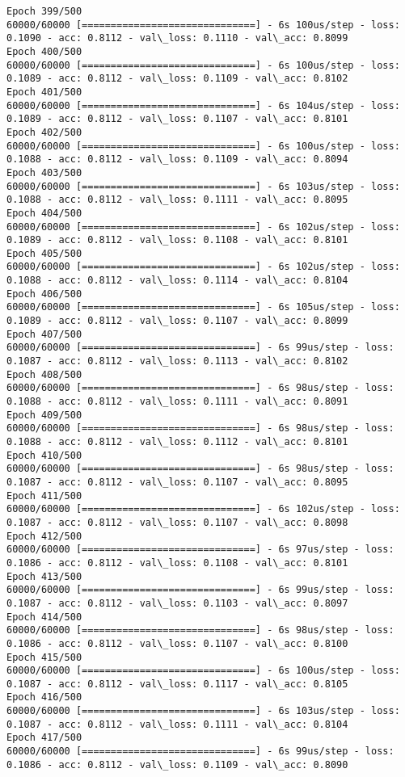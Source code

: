 \documentclass[11pt]{article}
\begin{document}
\begin{Verbatim}[commandchars=\\\{\}]
Epoch 399/500
60000/60000 [==============================] - 6s 100us/step - loss: 0.1090 - acc: 0.8112 - val\_loss: 0.1110 - val\_acc: 0.8099
Epoch 400/500
60000/60000 [==============================] - 6s 100us/step - loss: 0.1089 - acc: 0.8112 - val\_loss: 0.1109 - val\_acc: 0.8102
Epoch 401/500
60000/60000 [==============================] - 6s 104us/step - loss: 0.1089 - acc: 0.8112 - val\_loss: 0.1107 - val\_acc: 0.8101
Epoch 402/500
60000/60000 [==============================] - 6s 100us/step - loss: 0.1088 - acc: 0.8112 - val\_loss: 0.1109 - val\_acc: 0.8094
Epoch 403/500
60000/60000 [==============================] - 6s 103us/step - loss: 0.1088 - acc: 0.8112 - val\_loss: 0.1111 - val\_acc: 0.8095
Epoch 404/500
60000/60000 [==============================] - 6s 102us/step - loss: 0.1089 - acc: 0.8112 - val\_loss: 0.1108 - val\_acc: 0.8101
Epoch 405/500
60000/60000 [==============================] - 6s 102us/step - loss: 0.1088 - acc: 0.8112 - val\_loss: 0.1114 - val\_acc: 0.8104
Epoch 406/500
60000/60000 [==============================] - 6s 105us/step - loss: 0.1089 - acc: 0.8112 - val\_loss: 0.1107 - val\_acc: 0.8099
Epoch 407/500
60000/60000 [==============================] - 6s 99us/step - loss: 0.1087 - acc: 0.8112 - val\_loss: 0.1113 - val\_acc: 0.8102
Epoch 408/500
60000/60000 [==============================] - 6s 98us/step - loss: 0.1088 - acc: 0.8112 - val\_loss: 0.1111 - val\_acc: 0.8091
Epoch 409/500
60000/60000 [==============================] - 6s 98us/step - loss: 0.1088 - acc: 0.8112 - val\_loss: 0.1112 - val\_acc: 0.8101
Epoch 410/500
60000/60000 [==============================] - 6s 98us/step - loss: 0.1087 - acc: 0.8112 - val\_loss: 0.1107 - val\_acc: 0.8095
Epoch 411/500
60000/60000 [==============================] - 6s 102us/step - loss: 0.1087 - acc: 0.8112 - val\_loss: 0.1107 - val\_acc: 0.8098
Epoch 412/500
60000/60000 [==============================] - 6s 97us/step - loss: 0.1086 - acc: 0.8112 - val\_loss: 0.1108 - val\_acc: 0.8101
Epoch 413/500
60000/60000 [==============================] - 6s 99us/step - loss: 0.1087 - acc: 0.8112 - val\_loss: 0.1103 - val\_acc: 0.8097
Epoch 414/500
60000/60000 [==============================] - 6s 98us/step - loss: 0.1086 - acc: 0.8112 - val\_loss: 0.1107 - val\_acc: 0.8100
Epoch 415/500
60000/60000 [==============================] - 6s 100us/step - loss: 0.1087 - acc: 0.8112 - val\_loss: 0.1117 - val\_acc: 0.8105
Epoch 416/500
60000/60000 [==============================] - 6s 103us/step - loss: 0.1087 - acc: 0.8112 - val\_loss: 0.1111 - val\_acc: 0.8104
Epoch 417/500
60000/60000 [==============================] - 6s 99us/step - loss: 0.1086 - acc: 0.8112 - val\_loss: 0.1109 - val\_acc: 0.8090

\end{Verbatim}
\end{document}
